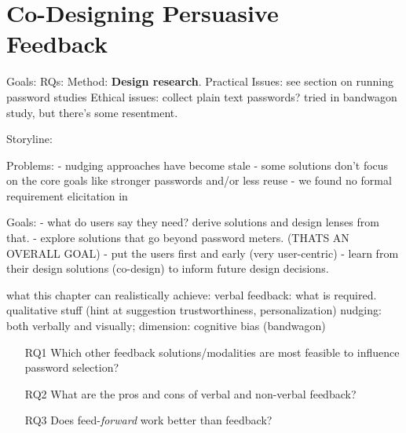 \chapter[Co-Designing Persuasive Feedback] {Co-Designing Persuasive \\ Feedback}\label{chap:feedback_modalities}



Goals: 
RQs:
Method: \textbf{Design research}.
Practical Issues: see section on running password studies
Ethical issues: collect plain text passwords? tried in bandwagon study, but there's some resentment. 


Storyline:

Problems:
- nudging approaches have become stale
- some solutions don't focus on the core goals like stronger passwords and/or less reuse
- we found no formal requirement elicitation in 


Goals:
- what do users say they need? derive solutions and design lenses from that. 
- explore solutions that go beyond password meters. (THATS AN OVERALL GOAL)
- put the users first and early (very user-centric)
- learn from their design solutions (co-design) to inform future design decisions.


% 

what this chapter can realistically achieve: 
verbal feedback: what is required. qualitative stuff (hint at suggestion trustworthiness, personalization)
nudging: both verbally and visually; dimension: cognitive bias (bandwagon)

\begin{itemize}
	\item[RQ1] Which other feedback solutions/modalities are most feasible to influence password selection?
	\item[RQ2] What are the pros and cons of verbal and non-verbal feedback?
	\item[RQ3] Does feed-\textit{forward} work better than feedback?
\end{itemize}


